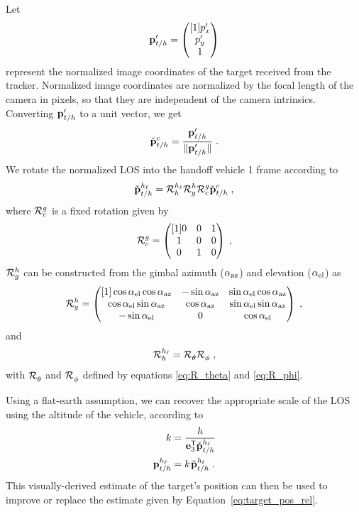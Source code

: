 Let
\begin{equation}
    \pimgvec_{\TGwrtH} = \pmat{\pimgvar_x \\ \pimgvar_y \\ 1}
\end{equation}
represent the normalized image coordinates of the target received from the tracker. Normalized image coordinates are normalized by the focal length of the camera in pixels, so that they are independent of the camera intrinsics.
Converting $\pimgvec_{\TGwrtH}$ to a unit vector, we get
\begin{equation}
    \ptg[\check]^c = \frac{\pimgvec_{\TGwrtH}}{\norm{\pimgvec_{\TGwrtH}}}\;.
\end{equation}
We rotate the normalized LOS into the handoff vehicle 1 frame according to
\begin{equation}
    \ptghv[\check] = \Rot{\hb}{\hv}\Rot{g}{\hb}\Rot{c}{g}\ptg[\check]^c\;,
\end{equation}
where $\Rot{c}{g}$ is a fixed rotation given by
\begin{equation}
    \Rot{c}{g} = \pmat{
      0 & 0 & 1 \\ 1 & 0 & 0 \\ 0 & 1 & 0
      }\;,
\end{equation}
$\Rot{g}{\hb}$ can be constructed from the gimbal azimuth ($\az$) and elevation ($\el$) as
\begin{equation}
    \Rot{g}{\hb} = \pmat{\cos\el\cos\az & -\sin\az & \sin\el\cos\az \\
                         \cos\el\sin\az &  \cos\az & \sin\el\sin\az \\
                         -\sin\el       &  0       & \cos\el}\;,
\end{equation}
and
\begin{equation}
  \Rot{\hb}{\hv} = \Rot{\theta}{}\Rot{\phi}{}\;,
\end{equation}
with $\Rot{\theta}{}$ and $\Rot{\phi}{}$ defined by equations \eqref{eq:R_theta} and \eqref{eq:R_phi}.

Using a flat-earth assumption, we can recover the appropriate scale of the LOS using the altitude of the vehicle, according to
\begin{align}
    k &= \frac{h}{\e_3^\transpose\ptghv[\check]} \\
    \label{eq:ptg_vis_scaled}
    \ptghv &= k\hspace{0.1em}\ptghv[\check]\;.
\end{align}
This visually-derived estimate of the target's position can then be used to improve or replace the estimate given by Equation~\eqref{eq:target_pos_rel}.

